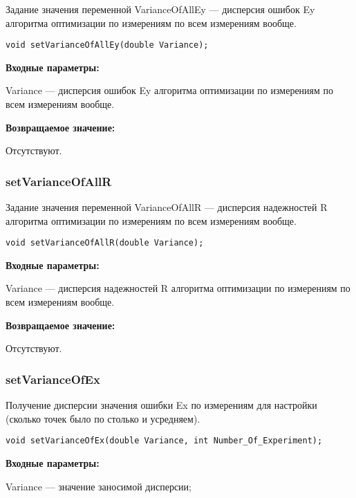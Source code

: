 \documentclass[a4paper,12pt]{article}
\begin{document}
Задание значения переменной VarianceOfAllEy --- дисперсия ошибок Ey алгоритма оптимизации по измерениям по всем измерениям вообще.


\begin{lstlisting}[label=code_syntax_setVarianceOfAllEy,caption=Синтаксис]
void setVarianceOfAllEy(double Variance);
\end{lstlisting}

\textbf{Входные параметры:}

Variance --- дисперсия ошибок Ey алгоритма оптимизации по измерениям по всем измерениям вообще.

\textbf{Возвращаемое значение:}

Отсутствуют.


\subsubsection{setVarianceOfAllR}\label{setVarianceOfAllR}

Задание значения переменной VarianceOfAllR --- дисперсия надежностей R алгоритма оптимизации по измерениям по всем измерениям вообще.


\begin{lstlisting}[label=code_syntax_setVarianceOfAllR,caption=Синтаксис]
void setVarianceOfAllR(double Variance);
\end{lstlisting}

\textbf{Входные параметры:}

Variance --- дисперсия надежностей R алгоритма оптимизации по измерениям по всем измерениям вообще.

\textbf{Возвращаемое значение:}

Отсутствуют.


\subsubsection{setVarianceOfEx}\label{setVarianceOfEx}

Получение дисперсии значения ошибки Ex по измерениям для настройки (сколько точек было по столько и усредняем).


\begin{lstlisting}[label=code_syntax_setVarianceOfEx,caption=Синтаксис]
void setVarianceOfEx(double Variance, int Number_Of_Experiment);
\end{lstlisting}

\textbf{Входные параметры:}

	 Variance --- значение заносимой дисперсии;
 
\end{document}
